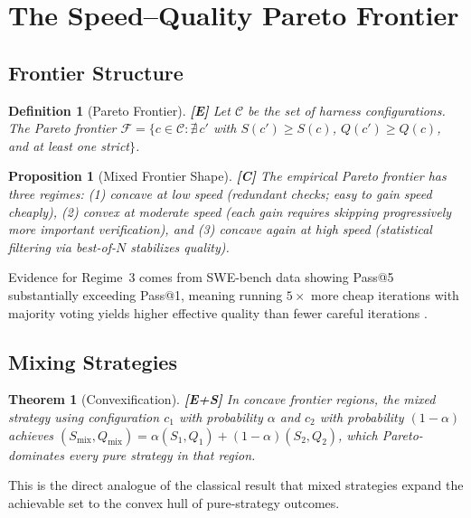 \documentclass[11pt, a4paper, logo, copyright]{googledeepmind}
\newtheorem{definition}{Definition}[section]
\newtheorem{theorem}{Theorem}[section]
\newtheorem{proposition}{Proposition}[section]
\begin{document}
\section{The Speed--Quality Pareto Frontier}\label{sec:pareto}

\subsection{Frontier Structure}

\begin{definition}[Pareto Frontier]\label{def:pareto}
\textbf{[E]} Let $\mathcal{C}$ be the set of harness configurations. The Pareto frontier $\mathcal{F} = \{c \in \mathcal{C} : \nexists\, c'$ with $S(c') \geq S(c)$, $Q(c') \geq Q(c)$, and at least one strict$\}$.
\end{definition}

\begin{proposition}[Mixed Frontier Shape]\label{prop:shape}
\textbf{[C]} The empirical Pareto frontier has three regimes: (1) concave at low speed (redundant checks; easy to gain speed cheaply), (2) convex at moderate speed (each gain requires skipping progressively more important verification), and (3) concave again at high speed (statistical filtering via best-of-$N$ stabilizes quality).
\end{proposition}

Evidence for Regime~3 comes from SWE-bench data showing Pass@5 substantially exceeding Pass@1, meaning running $5\times$ more cheap iterations with majority voting yields higher effective quality than fewer careful iterations \citep{sweeffi2025}.

\subsection{Mixing Strategies}

\begin{theorem}[Convexification]\label{thm:convex}
\textbf{[E+S]} In concave frontier regions, the mixed strategy using configuration $c_1$ with probability $\alpha$ and $c_2$ with probability $(1-\alpha)$ achieves $(S_{\mathrm{mix}}, Q_{\mathrm{mix}}) = \alpha(S_1, Q_1) + (1-\alpha)(S_2, Q_2)$, which Pareto-dominates every pure strategy in that region.
\end{theorem}

This is the direct analogue of the classical result that mixed strategies expand the achievable set to the convex hull of pure-strategy outcomes.
\end{document}
